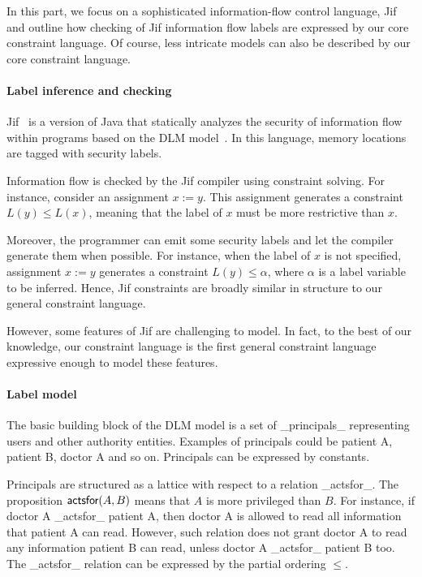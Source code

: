 In this part, we focus on a sophisticated information-flow control
language, Jif~\cite{jif} and outline how checking of Jif information
flow labels are expressed by our core constraint language. Of
course, less intricate models can also be described by our core
constraint language.

\paragraph{Label inference and checking}

Jif~\cite{jif} is a version of Java that statically analyzes the security of
information flow within programs based on the DLM model~\cite{ml-ifc-97}. In
this language, memory locations are tagged with security labels.

Information flow is checked by the Jif compiler using constraint
solving. For instance, consider an assignment $x := y$. This
assignment generates a constraint $L(y)\leq L(x)$, meaning that the
label of $x$ must be more restrictive than $x$.

Moreover, the programmer can emit some security labels and let the
compiler generate them when possible. For instance, when the label of
$x$ is not specified, assignment $x := y$ generates a constraint
$L(y)\leq \alpha$, where $\alpha$ is a label variable to be inferred.
Hence, Jif constraints are broadly similar in structure
to our general constraint language.

However, some features of Jif are challenging to model.  In fact, to
the best of our knowledge, our constraint language is the first
general constraint language expressive enough to model these features.

\paragraph{Label model}

The basic building block of the DLM model is a set of _principals_
representing users and other authority entities. Examples of
principals could be patient A, patient B, doctor A and so on.
Principals can be expressed by constants.

Principals are structured as a lattice with respect to a relation
_actsfor_.  The proposition $\textsf{actsfor}(A,B)$ means that $A$ is more
privileged than $B$.
% 
For instance, if doctor A _actsfor_ patient A, then doctor A is
allowed to read all information that patient A can read. However, such
relation does not grant doctor A to read any information patient B can
read, unless doctor A _actsfor_ patient B too. The _actsfor_ relation
can be expressed by the partial ordering $\leq$.

